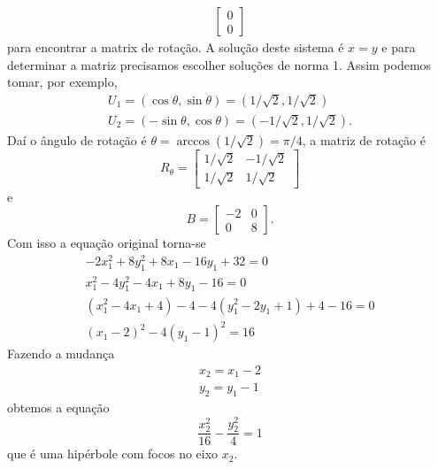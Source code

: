 \begin{exemplos}
\begin{enumerate}
\begin{solucao}
\begin{align*}
\begin{bmatrix}
          0 \\0
        \end{bmatrix}
      \end{align*}
      para encontrar a matrix de rotação. A solução deste sistema é $x = y$ e para determinar a matriz precisamos escolher soluções de norma 1. Assim podemos tomar, por exemplo,
      \begin{align*}
        U_1 = (\cos\theta, \sin\theta) = (1/\sqrt{2}, 1/\sqrt{2})\\
        U_2 = (-\sin\theta, \cos\theta) = (-1/\sqrt{2}, 1/\sqrt{2}).
      \end{align*}
      Daí o ângulo de rotação é $\theta = \arccos(1/\sqrt{2}) = \pi/4$, a matriz de rotação é
      \[
        R_\theta = \begin{bmatrix}
          1/\sqrt{2} & -1/\sqrt{2}\\
          1/\sqrt{2} & 1/\sqrt{2}
        \end{bmatrix}
      \]
      e
      \[
        B = \begin{bmatrix}
          -2 & 0\\
          0 & 8
        \end{bmatrix}.
      \]
      Com isso a equação original torna-se
      \begin{align*}
        -2x_1^2 + 8y_1^2 + 8x_1 -16y_1 + 32 = 0\\
        x_1^2 - 4y_1^2 - 4x_1 + 8y_1 -16 = 0\\
        (x_1^2 - 4x_1 + 4) - 4 - 4(y_1^2 - 2y_1 + 1) + 4 - 16 = 0\\
        (x_1 - 2)^2 - 4(y_1 - 1)^2 = 16
      \end{align*}
      Fazendo a mudança
      \begin{align*}
        x_2 = x_1 - 2\\
        y_2 = y_1 - 1
      \end{align*}
      obtemos a equação
      \[
        \dfrac{x_2^2}{16} - \dfrac{y_2^2}{4} = 1
      \]
      que é uma hipérbole com focos no eixo $x_2$.
    \end{solucao}
  \end{enumerate}
\end{exemplos}




